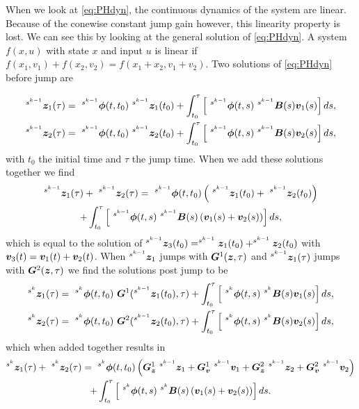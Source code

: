 \documentclass[DC2017114Bouma.tex]{subfiles}
\begin{document}
When we look at \eqref{eq:PHdyn}, the continuous dynamics of the system are linear. Because of the conewise constant jump gain however, this linearity property is lost. We can see this by looking at the general solution of \eqref{eq:PHdyn}. A system $f(x,u)$ with state $x$ and input $u$ is linear if $f(x_1,v_1) + f(x_2,v_2) = f(x_1+x_2,v_1+v_2)$. Two solutions of \eqref{eq:PHdyn} before jump are

\begin{align}
^{s^{k-1}}\zb_1(\tau) &= \ ^{s^{k-1}}\phib(t,t_0)\ ^{s^{k-1}}\zb_1(t_0) + \int_{t_0}^\tau \left[\ ^{s^{k-1}}\phib(t,s)\ ^{s^{k-1}}\Bb(s)\vb_1(s)\right]ds,\\
^{s^{k-1}}\zb_2(\tau) &= \ ^{s^{k-1}}\phib(t,t_0)\ ^{s^{k-1}}\zb_2(t_0) + \int_{t_0}^\tau \left[\ ^{s^{k-1}}\phib(t,s)\ ^{s^{k-1}}\Bb(s)\vb_2(s)\right]ds,
\end{align}
with $t_0$ the initial time and $\tau$ the jump time.
When we add these solutions together we find
\begin{multline}
^{s^{k-1}}\zb_1(\tau) + \ ^{s^{k-1}}\zb_2(\tau) = \ ^{s^{k-1}}\phib(t,t_0)\left(\ ^{s^{k-1}}\zb_1(t_0) + \ ^{s^{k-1}}\zb_2(t_0)\right) \\+ \int_{t_0}^\tau \left[\ ^{s^{k-1}}\phib(t,s)\ ^{s^{k-1}}\Bb(s)\left(\vb_1(s) + \vb_2(s)\right)\right]ds,
\end{multline}
which is equal to the solution of $^{s^{k-1}}{\boldsymbol{z}}_3(t_0) = ^{s^{k-1}}{\boldsymbol{z}}_1(t_0) + ^{s^{k-1}}{\boldsymbol{z}}_2(t_0)$ with ${\boldsymbol{v}}_3(t) = {\boldsymbol{v}}_1(t) + {\boldsymbol{v}}_2(t)$. When $^{s^{k-1}}{\boldsymbol{z}}_1$ jumps with ${\boldsymbol{G}}^1({\boldsymbol{z}},\tau)$ and $^{s^{k-1}}{\boldsymbol{z}}_1(\tau)$ jumps with ${\boldsymbol{G}}^2({\boldsymbol{z}},\tau)$ we find the solutions post jump to be
\begin{align}
^{s^{k}}\zb_1(\tau) &= \ ^{s^{k}}\phib(t,t_0)\ \Gb^1(^{s^{k-1}}\zb_1(t_0),\tau) + \int_{t_0}^\tau \left[\ ^{s^{k}}\phib(t,s)\ ^{s^{k}}\Bb(s)\vb_1(s)\right]ds,\label{eq:z1sol}\\
^{s^{k}}\zb_2(\tau) &= \ ^{s^{k}}\phib(t,t_0)\ \Gb^2(^{s^{k-1}}\zb_2(t_0),\tau) + \int_{t_0}^\tau \left[\ ^{s^{k}}\phib(t,s)\ ^{s^{k}}\Bb(s)\vb_2(s)\right]ds,
\end{align}
which when added together results in
\begin{multline}
^{s^{k}}\zb_1(\tau) + \ ^{s^{k}}\zb_2(\tau) = \ ^{s^{k}}\phib(t,t_0)\left(\Gb_\zb^1 \ ^{s^{k-1}}\zb_1 + \Gb_\vb^1\ ^{s^{k-1}}\vb_1 + \Gb_\zb^2 \ ^{s^{k-1}}\zb_2 + \Gb_\vb^2\ ^{s^{k-1}}\vb_2\right) \\+ \int_{t_0}^\tau \left[\ ^{s^{k}}\phib(t,s)\ ^{s^{k}}\Bb(s)\left(\vb_1(s) + \vb_2(s)\right)\right]ds.\label{eq:soladd}
\end{multline}
\end{document}
